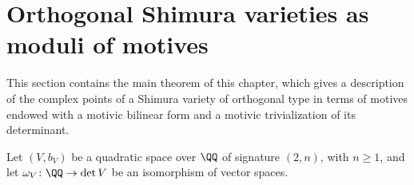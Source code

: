 %
%
%
%
\section{Orthogonal Shimura varieties as moduli of motives}\label{sec:orthogonal_shimura_varieties}
This section contains the main theorem of this chapter, which gives a description of the complex points of a Shimura variety of orthogonal type in terms of motives endowed with a motivic bilinear form and a motivic trivialization of its determinant.

Let $(V,b_V)$ be a quadratic space over $\QQ$ of signature $(2,n)$, with $n \geq 1$, and let $\omega_V\colon \QQ \rightarrow \det V$ be an isomorphism of vector spaces.

